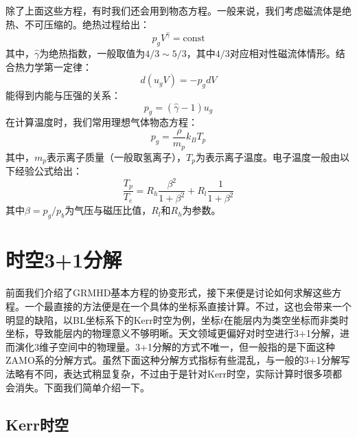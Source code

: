 \documentclass[lang=cn,color=blue,cm,11pt,scheme=chinese,bibend=bibtex,sorting=nty]{elegantbook}
\begin{document}
	\begin{note}
		除了上面这些方程，有时我们还会用到物态方程。一般来说，我们考虑磁流体是绝热、不可压缩的。绝热过程给出：
		\begin{equation}
			p_g V^{\hat{\gamma}} = \text{const}
		\end{equation}
		其中，$\hat{\gamma}$为绝热指数，一般取值为$4/3 \sim 5/3$，其中$4/3$对应相对性磁流体情形。结合热力学第一定律：
		\begin{equation}
			d (u_g V) = - p_g d V
		\end{equation}
		能得到内能与压强的关系：
		\begin{equation}
			p_g = (\hat{\gamma} - 1) u_g
		\end{equation}
		在计算温度时，我们常用理想气体物态方程：
		\begin{equation}
			p_g = \frac{\rho}{m_p} k_B T_p
		\end{equation}
		其中，$m_p$表示离子质量（一般取氢离子），$T_p$为表示离子温度。电子温度一般由以下经验公式给出：
		\begin{equation}
			\frac{T_p}{T_e} = R_h \frac{\beta^2}{1 + \beta^2} + R_l \frac{1}{1 + \beta^2}
		\end{equation}
		其中$\beta = p_g / p_b$为气压与磁压比值，$R_l$和$R_h$为参数。
	\end{note}
	
	\section{时空3+1分解}
	
	前面我们介绍了GRMHD基本方程的协变形式，接下来便是讨论如何求解这些方程。一个最直接的方法便是在一个具体的坐标系直接计算。不过，这也会带来一个明显的缺陷，以BL坐标系下的Kerr时空为例，坐标$t$在能层内为类空坐标而非类时坐标，导致能层内的物理意义不够明晰。天文领域更偏好对时空进行3+1分解，进而演化3维子空间中的物理量。3+1分解的方式不唯一，但一般指的是下面这种ZAMO系的分解方式。虽然下面这种分解方式指标有些混乱，与一般的3+1分解写法略有不同，表达式稍显复杂，不过由于是针对Kerr时空，实际计算时很多项都会消失。下面我们简单介绍一下。
	
	\subsection{Kerr时空}
	
\end{document}
